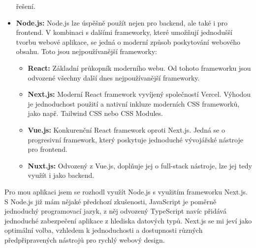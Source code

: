 \begin{itemize}
        řešení.
    \item \textbf{Node.js:} Node.js lze úspěšně použít nejen pro backend,
        ale také i pro frontend. V kombinaci s dalšími frameworky, které
        umožňují jednodušší tvorbu webové aplikace, se jedná o moderní
        způsob poskytování webového obsahu. Toto jsou nejpoužívanější
        frameworky:
        \begin{itemize}
            \item \textbf{React:} Základní průkopník moderního webu. Od tohoto
                frameworku jsou odvozené všechny další dnes nejpoužívanější
                frameworky.
            \item \textbf{Next.js:} Moderní React framework vyvíjený společností
                Vercel. Výhodou je jednoduchost použití a nativní inkluze
                moderních CSS frameworků, jako např. Tailwind CSS nebo CSS
                Modules.
            \item \textbf{Vue.js:} Konkurenční React framework oproti Next.js.
                Jedná se o progresivní framework, který poskytuje jednoduché
                vývojářské nástroje pro frontend.
            \item \textbf{Nuxt.js:} Odvozený z Vue.js, doplňuje jej o full-stack
                nástroje, lze jej tedy využít i jako backend.
        \end{itemize}
\end{itemize}

Pro mou aplikaci jsem se rozhodl využít Node.js s využitím frameworku Next.js.
S Node.js již mám nějaké předchozí zkušenosti, JavaScript je poměrně jednoduchý
programovací jazyk, z něj odvozený TypeScript navíc přidává jednoduché
zabezpečení aplikace z hlediska datových typů. Next.js se mi jeví jako optimální
volba, vzhledem k jednoduchosti a dostupnosti různých předpřipravených nástrojů
pro rychlý webový design.

\endinput
